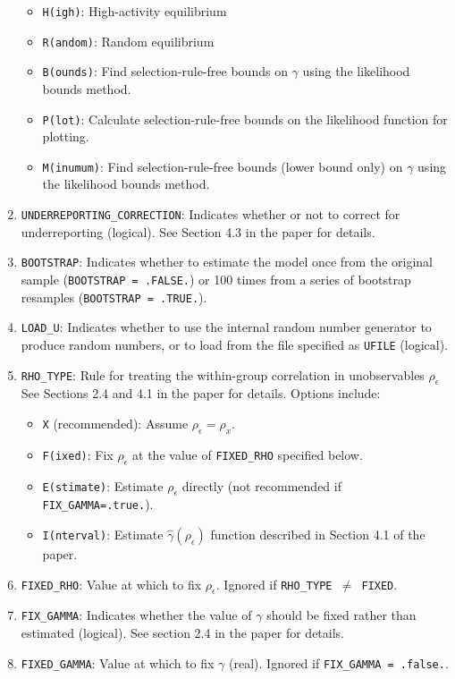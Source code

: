 \documentclass{article}
\begin{document}
\begin{enumerate}
\begin{itemize}
		\item {\tt H(igh)}: High-activity equilibrium
		\item {\tt R(andom)}: Random equilibrium
		\item {\tt B(ounds)}: Find selection-rule-free bounds on $\gamma$ using the likelihood bounds
			method.
		\item {\tt P(lot)}: Calculate selection-rule-free bounds on the likelihood function for 
			plotting.
		\item {\tt M(inumum)}: Find selection-rule-free bounds (lower bound only) 
			on $\gamma$ using the likelihood bounds	method.
	\end{itemize}
\item {\tt UNDERREPORTING\_{}CORRECTION}: Indicates whether or not to correct for underreporting (logical).  See 
	Section 4.3 in the paper for details.
\item {\tt BOOTSTRAP}: Indicates whether to estimate the model once from the original sample 
	({\tt BOOTSTRAP = .FALSE.}) or 100 times from a series of bootstrap resamples ({\tt BOOTSTRAP = .TRUE.}).
\item {\tt LOAD\_{}U}: Indicates whether to use the internal random number generator to produce 
	random numbers, or to load from the file specified as {\tt UFILE} (logical).  
\item {\tt RHO\_{}TYPE}: Rule for treating the within-group correlation in unobservables $\rho_{\epsilon}$
	See Sections 2.4 and 4.1 in the paper for details. Options include:
	\begin{itemize}
		\item {\tt X} (recommended): Assume $\rho_{\epsilon}=\rho_x$.
		\item {\tt F(ixed)}: Fix $\rho_{\epsilon}$ at the value of {\tt FIXED\_RHO} specified below.
		\item {\tt E(stimate)}: Estimate $\rho_{\epsilon}$ directly (not recommended if {\tt FIX\_GAMMA=.true.}).
		\item {\tt I(nterval)}: Estimate $\hat{\gamma}(\rho_{\epsilon})$ function described in Section 4.1 of
			the paper.
	\end{itemize}
\item {\tt FIXED\_RHO}: Value at which to fix $\rho_{\epsilon}$.  Ignored if {\tt RHO\_TYPE $\neq$ FIXED}.
\item {\tt FIX\_GAMMA}: Indicates whether the value of $\gamma$ should be fixed rather than estimated (logical).
	See section 2.4 in the paper for details.
\item {\tt FIXED\_GAMMA}: Value at which to fix $\gamma$ (real).  Ignored if {\tt FIX\_GAMMA = .false.}.

\end{enumerate}
\end{document}

